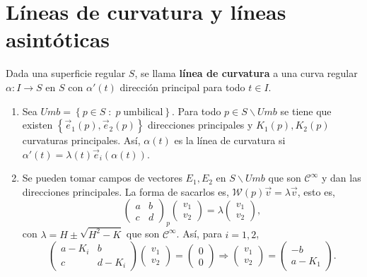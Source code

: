 \section{Líneas de curvatura y líneas asintóticas}
\begin{definition}
Dada una superficie regular $\displaystyle S $, se llama \textbf{línea de curvatura} a una curva regular $\displaystyle \alpha : I \to S $ en $\displaystyle S $ con $\displaystyle \alpha'\left(t\right) $ dirección principal para todo $\displaystyle t \in I $.
\end{definition}
\begin{observation}
\begin{enumerate}
	\item Sea $\displaystyle Umb = \left\{ p \in S \; : \; p \; \text{umbilical}\right\}  $. Para todo $\displaystyle p \in S \backslash Umb $ se tiene que existen $\displaystyle \left\{ \vec{e}_{1}\left(p\right), \vec{e}_{2}\left(p\right)\right\}  $ direcciones principales y $\displaystyle K_{1}\left(p\right), K_{2}\left(p\right) $ curvaturas principales. 
	Así, $\displaystyle \alpha\left(t\right) $ es la línea de curvatura si $\displaystyle \alpha'\left(t\right)=\lambda\left(t\right)\vec{e}_{i}\left(\alpha\left(t\right)\right) $. 
\item Se pueden tomar campos de vectores $\displaystyle E_{1}, E_{2} $ en $\displaystyle S \backslash Umb $ que son $\displaystyle \mathcal{C}^{\infty } $ y dan las direcciones principales. La forma de sacarlos es, $\displaystyle \mathcal{W}\left(p\right)\vec{v}=\lambda \vec{v} $, esto es, 
	\[\begin{pmatrix} a & b \\ c & d \end{pmatrix}_{p}\begin{pmatrix} v_{1} \\ v_{2} \end{pmatrix}=\lambda \begin{pmatrix} v_{1} \\ v_{2} \end{pmatrix} ,\]
	con $\displaystyle \lambda = H\pm \sqrt{H^{2}-K} $ que son $\displaystyle \mathcal{C}^{\infty } $. Así, para $\displaystyle i = 1,2 $, 
	\[\begin{pmatrix} a-K_{i} & b \\ c & d-K_{i} \end{pmatrix}\begin{pmatrix} v_{1} \\ v_{2} \end{pmatrix}=\begin{pmatrix} 0 \\ 0 \end{pmatrix}\Rightarrow \begin{pmatrix} v_{1} \\ v_{2} \end{pmatrix}=\begin{pmatrix} -b \\ a - K_{1} \end{pmatrix} .\]

\end{enumerate}
\end{observation}
